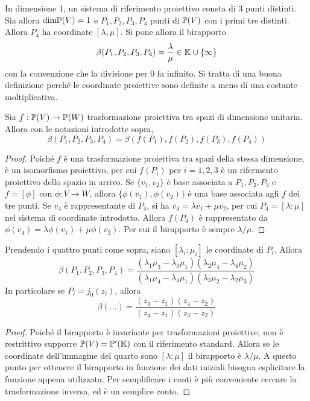 \renewcommand{\dim}{\text{dim}}

In dimensione 1, un sistema di riferimento proiettivo consta di 3 punti distinti. 
Sia allora $\dim\P(V)=1$ e $P_1,P_2,P_3,P_4$ punti di $\P(V)$ con i primi tre
distinti. Allora $P_4$ ha coordinate $[\lambda, \mu]$. Si pone allora il
birapporto
\[
    \beta(P_1,P_2,P_3,P_4)=\frac{\lambda}{\mu}\in \K\cup \{\infty\}
\]
con la convenzione che la divisione per 0 fa infinito. Si tratta di una buona
definizione perch\'e le coordinate proiettive sono definite a meno di una
costante moltiplicativa.

\begin{thm}
    Sia $f:\P(V)\rightarrow\P(W)$ trasformazione proiettiva tra spazi di
    dimensione unitaria. Allora con le notazioni introdotte sopra,
\[
    \beta(P_1,P_2,P_3,P_4)=\beta(f(P_1),f(P_2),f(P_3),f(P_4))
\]
\end{thm}
\begin{proof}
    Poich\'e $f$ \`e una trasformazione proiettiva tra spazi della stessa
    dimensione, \`e un isomorfismo proiettivo, per cui $f(P_i)$ per $i=1,2,3$
    \`e un rifermento proiettivo dello spazio in arrivo. Se $\{v_1,v_2\}$ \`e
    base associata a $P_1,P_2,P_3$ e $f=[\phi]$ con $\phi:V\rightarrow W$,
    allora $\{\phi(v_1), \phi(v_2)\}$ \`e una base associata agli $f$ dei tre
    punti. Se $v_4$ \`e rappresentante di $P_4$, si ha $v_4 = \lambda v_1 + \mu
    v_2$, per cui $P_4=[\lambda:\mu]$ nel sistema di coordinate introdotto. 
    Allora $f(P_4)$ \`e rappresentato da $\phi(v_4)=\lambda \phi(v_1)+\mu
    \phi(v_2)$. Per cui il birapporto \`e sempre $\lambda/\mu$.
\end{proof}

\begin{thm}
    Prendendo i quattro punti come sopra, siano $[\lambda_i:\mu_i]$ le
    coordinate di $P_i$. Allora
\[
    \beta(P_1,P_2,P_3,P_4)=\frac{(\lambda_1\mu_3-\lambda_3\mu_1)
    (\lambda_2\mu_4-\lambda_4\mu_2)} {(\lambda_1\mu_4-\lambda_4\mu_1)
    (\lambda_3\mu_2-\lambda_2\mu_3)}
\]
    In particolare se $P_i = j_0(z_i)$, allora
\[
    \beta(\dots) = \frac{(z_3-z_1)(z_4-z_2)}{(z_4-z_1)(z_3-z_2)}
\]
\end{thm}
\begin{proof}
    Poich\'e il birapporto \`e invariante per trasformazioni proiettive, non \`e
    restrittivo supporre $\P(V)=\P'(\K)$ con il riferimento standard. Allora se
    le coordinate dell'immagine del quarto sono $[\lambda:\mu]$ il birapporto
    \`e $\lambda/\mu$. A questo punto per ottenere il birapporto in funzione dei
    dati iniziali bisogna esplicitare la funzione appena utilizzata. Per
    semplificare i conti \`e pi\`u conveniente cercare la trasformazione
    inversa, ed \`e un semplice conto.
\end{proof}

